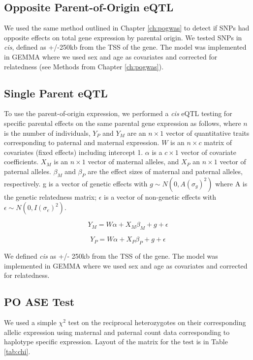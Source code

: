 \subsection{Opposite Parent-of-Origin eQTL}\label{Opposite Parent-of-Origin eQTL}
We used the same method outlined in Chapter \ref{ch:pogwas} to detect if SNPs had opposite effects on total gene expression by parental origin. We tested SNPs in \emph{cis}, defined as +/-250kb from the TSS of the gene. The model was implemented in GEMMA\cite{Zhou2012} where we used sex and age as covariates and corrected for relatedness (see Methods from Chapter  \ref{ch:pogwas}).

\subsection{Single Parent eQTL}\label{Single Parent eQTL}
To use the parent-of-origin expression, we performed a \emph{cis} eQTL testing for specific parental effects on the same parental gene expression as follows, where  $n$ is the number of individuals, $Y_{P}$ and $Y_{M}$ are an $n \times 1$ vector of quantitative traits corresponding to paternal and maternal expression. $W$ is an $n \times c$ matrix of covariates (fixed effects) including intercept 1. $\alpha$ is a $c \times 1$ vector of covariate coefficients. $X_M$  is an $n \times 1$ vector of maternal alleles, and $X_P$ an $n \times 1$ vector of paternal alleles. $\beta_M$ and $\beta_P$ are the effect sizes of maternal and paternal alleles, respectively. g is a vector of genetic effects with $g \sim N(0, A(\sigma_g)^2 )$ where A is the genetic relatedness matrix; $\epsilon$ is a vector of non-genetic effects with $\epsilon \sim N(0,I(\sigma_e)^2)$.

\begin{equation}
Y _{M}=W\alpha + X_{M}\beta_{M}+g+\epsilon
\end{equation}

\begin{equation}
Y _{P}=W\alpha + X_{P}\beta_{P}+g+\epsilon
\end{equation}

We defined \emph{cis} as +/- 250kb from the TSS of the gene. The model was implemented in GEMMA\cite{Zhou2012} where we used sex and age as covariates and corrected for relatedness.

\subsection{PO ASE Test}\label{PO ASE Test}
We used a simple $\chi^2$ test on the reciprocal heterozygotes on their corresponding allelic expression using maternal and paternal count data corresponding to haplotype specific expression. Layout of the matrix for the test is in Table \ref{tab:chi}.

